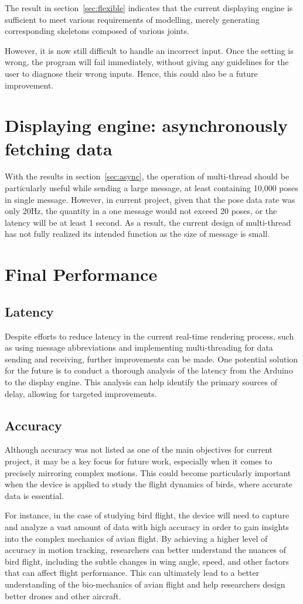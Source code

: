 The result in section~\ref{sec:flexible} indicates that the current displaying engine is sufficient to meet various requirements of modelling, merely generating corresponding skeletons composed of various joints.

However, it is now still difficult to handle an incorrect input.
Once the setting is wrong, the program will fail immediately, without giving any guidelines for the user to diagnose their wrong inputs.
Hence, this could also be a future improvement.


\section{Displaying  engine:  asynchronously  fetching data}
With the results in section~\ref{sec:async}, the operation of multi-thread should be particularly useful while sending a large message, at least containing 10,000 poses in single message.
However, in current project, given that the pose data rate was only 20Hz, the quantity in a one message would not exceed 20 poses, or the latency will be at least 1 second.
As a result, the current design of multi-thread has not fully realized its intended function as the size of message is small.

\section{Final Performance}

\subsection{Latency}
Despite efforts to reduce latency in the current real-time rendering process, such as using message abbreviations and implementing multi-threading for data sending and receiving, further improvements can be made.
One potential solution for the future is to conduct a thorough analysis of the latency from the Arduino to the display engine.
This analysis can help identify the primary sources of delay, allowing for targeted improvements.

\subsection{Accuracy}
Although accuracy was not listed as one of the main objectives for current project, it may be a key focus for future work, especially when it comes to precisely mirroring complex motions.
This could become particularly important when the device is applied to study the flight dynamics of birds, where accurate data is essential.

For instance, in the case of studying bird flight, the device will need to capture and analyze a vast amount of data with high accuracy in order to gain insights into the complex mechanics of avian flight.
By achieving a higher level of accuracy in motion tracking, researchers can better understand the nuances of bird flight, including the subtle changes in wing angle, speed, and other factors that can affect flight performance.
This can ultimately lead to a better understanding of the bio-mechanics of avian flight and help researchers design better drones and other aircraft.
